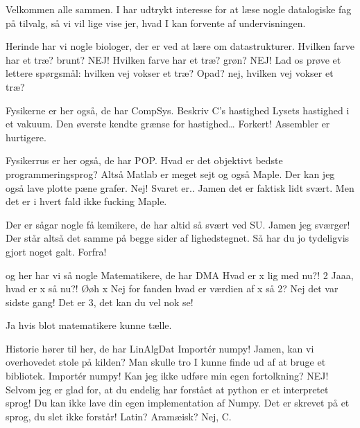 \documentclass[a4paper,11pt]{article}
\begin{document}
\begin{sketch}
Velkommen alle sammen.
I har udtrykt interesse for at læse nogle datalogiske fag på tilvalg,
så vi vil lige vise jer, hvad I kan forvente af undervisningen.

	Herinde har vi nogle biologer, der er ved at lære om datastrukturer.
 Hvilken farve har et træ?
	brunt?
   NEJ! Hvilken farve har et træ?
	grøn?
   NEJ! Lad os prøve et lettere spørgsmål:
   hvilken vej vokser et træ?
	Opad?
nej, hvilken vej vokser et træ?

	Fysikerne er her også, de har CompSys.
	Beskriv C’s hastighed
	Lysets hastighed i et vakuum. Den øverste kendte grænse for hastighed…
	Forkert! Assembler er hurtigere.

	Fysikerrus er her også, de har POP.
	Hvad er det objektivt bedste programmeringsprog?
	Altså Matlab er meget sejt og også Maple. Der kan jeg også lave plotte pæne grafer.
	Nej! Svaret er.. Jamen det er faktisk lidt svært. Men det er i hvert fald ikke fucking Maple.

	Der er sågar nogle få kemikere, de har altid så svært ved SU.
	Jamen jeg sværger! Der står altså det samme på begge sider af lighedstegnet.
	Så har du jo tydeligvis gjort noget galt. Forfra!


 og her har vi så nogle Matematikere, de har DMA
 Hvad er x lig med nu?!
 2
 Jaaa, hvad er x så nu?!
 Øøh x
 Nej for fanden hvad er værdien af x
 så 2?
 Nej det var sidste gang! Det er 3, det kan du vel nok se!

 Ja hvis blot matematikere kunne tælle.

	Historie hører til her, de har LinAlgDat
	Importér numpy!
	Jamen, kan vi overhovedet stole på kilden?
	Man skulle tro I kunne finde ud af at bruge et bibliotek. Importér numpy!
	Kan jeg ikke udføre min egen fortolkning?
  NEJ!
 Selvom jeg er glad for, at du endelig har forstået at python er et interpretet sprog!
Du kan ikke lave din egen implementation af Numpy.
Det er skrevet på et sprog, du slet ikke forstår!
	Latin? Aramæisk?
	Nej, C.


\end{sketch}
\end{document}

